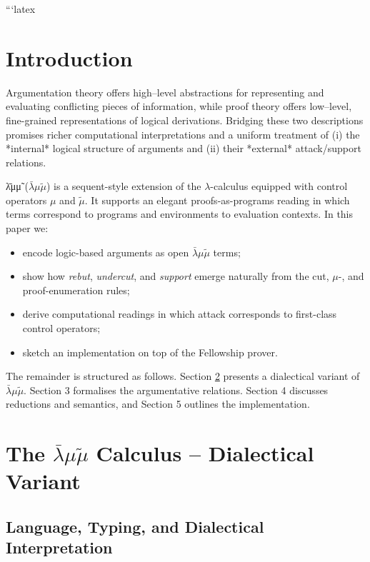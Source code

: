 \documentclass{ecai}
\newcommand{\matilda}{\bar{\lambda}\mu \tilde{\mu}}
\begin{document}
\begin{gpt}
```latex

\section{Introduction}
Argumentation theory offers high–level abstractions for representing and
evaluating conflicting pieces of information, while proof theory offers
low–level, fine-grained representations of logical derivations.  Bridging
these two descriptions promises richer computational interpretations and
a uniform treatment of (i) the *internal* logical structure of arguments
and (ii) their *external* attack/support relations.

λ̄μμ̃ ($\matilda$) is a sequent-style extension of the $\lambda$-calculus
equipped with control operators $\mu$ and $\tilde\mu$.  It supports an
elegant proofs-as-programs reading in which terms correspond to programs
and environments to evaluation contexts.  In this paper we:

\begin{itemize}
  \item encode logic-based arguments as open $\matilda$ terms;
  \item show how \emph{rebut}, \emph{undercut}, and \emph{support} emerge
        naturally from the cut, $\mu$-, and proof-enumeration rules;
  \item derive computational readings in which attack corresponds to
        first-class control operators;
  \item sketch an implementation on top of the Fellowship prover.
\end{itemize}

The remainder is structured as follows.  Section \ref{sec:matilda}
presents a dialectical variant of $\matilda$.  Section 3 formalises the
argumentative relations. Section 4 discusses reductions and semantics,
and Section 5 outlines the implementation.


\section{The $\matilda$ Calculus – Dialectical Variant}\label{sec:matilda}

\subsection{Language, Typing, and Dialectical Interpretation}

\end{gpt}
\end{document}
